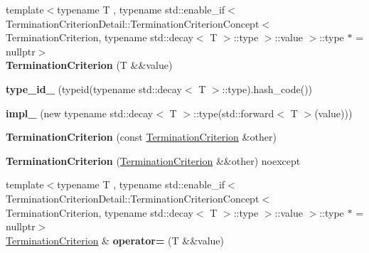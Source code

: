 \begin{DoxyCompactItemize}
\item 
\hypertarget{classSpacy_1_1CG_1_1TerminationCriterion_a802fa06abd50e597332969cbd7d39bc5}{{\footnotesize template$<$typename T , typename std\-::enable\-\_\-if$<$ Termination\-Criterion\-Detail\-::\-Termination\-Criterion\-Concept$<$ Termination\-Criterion, typename std\-::decay$<$ T $>$\-::type $>$\-::value $>$\-::type $\ast$  = nullptr$>$ }\\{\bfseries \-Termination\-Criterion} (\-T \&\&value)}\label{classSpacy_1_1CG_1_1TerminationCriterion_a802fa06abd50e597332969cbd7d39bc5}

\item 
\hypertarget{classSpacy_1_1CG_1_1TerminationCriterion_ab35e148df8e7c966f34667a566dfb91c}{{\bfseries type\-\_\-id\-\_\-} (typeid(typename std\-::decay$<$ \-T $>$\-::type).hash\-\_\-code())}\label{classSpacy_1_1CG_1_1TerminationCriterion_ab35e148df8e7c966f34667a566dfb91c}

\item 
\hypertarget{classSpacy_1_1CG_1_1TerminationCriterion_ad8d0896e0a17294b0c00c61315bd2bb5}{{\bfseries impl\-\_\-} (new typename std\-::decay$<$ \-T $>$\-::type(std\-::forward$<$ \-T $>$(value)))}\label{classSpacy_1_1CG_1_1TerminationCriterion_ad8d0896e0a17294b0c00c61315bd2bb5}

\item 
\hypertarget{classSpacy_1_1CG_1_1TerminationCriterion_a84ed627e669d2eecef2624fc5a63c457}{{\bfseries \-Termination\-Criterion} (const \hyperlink{classSpacy_1_1CG_1_1TerminationCriterion}{\-Termination\-Criterion} \&other)}\label{classSpacy_1_1CG_1_1TerminationCriterion_a84ed627e669d2eecef2624fc5a63c457}

\item 
\hypertarget{classSpacy_1_1CG_1_1TerminationCriterion_aebcda59709577698d88bb01fe81dd470}{{\bfseries \-Termination\-Criterion} (\hyperlink{classSpacy_1_1CG_1_1TerminationCriterion}{\-Termination\-Criterion} \&\&other) noexcept}\label{classSpacy_1_1CG_1_1TerminationCriterion_aebcda59709577698d88bb01fe81dd470}

\item 
\hypertarget{classSpacy_1_1CG_1_1TerminationCriterion_ac0f2c2ed8e6cb00861ae1131eb2eb3a2}{{\footnotesize template$<$typename T , typename std\-::enable\-\_\-if$<$ Termination\-Criterion\-Detail\-::\-Termination\-Criterion\-Concept$<$ Termination\-Criterion, typename std\-::decay$<$ T $>$\-::type $>$\-::value $>$\-::type $\ast$  = nullptr$>$ }\\\hyperlink{classSpacy_1_1CG_1_1TerminationCriterion}{\-Termination\-Criterion} \& {\bfseries operator=} (\-T \&\&value)}\label{classSpacy_1_1CG_1_1TerminationCriterion_ac0f2c2ed8e6cb00861ae1131eb2eb3a2}


\end{DoxyCompactItemize}
